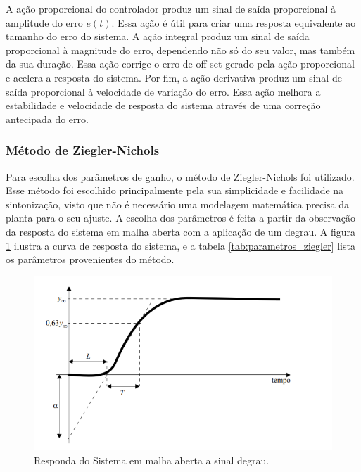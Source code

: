 A ação proporcional do controlador produz um sinal de saída proporcional à amplitude do erro $e(t)$. Essa ação é útil para criar uma resposta equivalente ao tamanho do erro do sistema. A ação integral produz um sinal de saída proporcional à magnitude do erro, dependendo não só do seu valor, mas também da sua duração. Essa ação corrige o erro de off-set gerado pela ação proporcional e acelera a resposta do sistema. Por fim, a ação derivativa produz um sinal de saída proporcional à velocidade de variação do erro. Essa ação melhora a estabilidade e velocidade de resposta do sistema através de uma correção antecipada do erro. 


\subsubsection{Método de Ziegler-Nichols}


Para escolha dos parâmetros de ganho, o método de Ziegler-Nichols foi utilizado. Esse método foi escolhido principalmente pela sua simplicidade e facilidade na sintonização, visto que não é necessário uma modelagem matemática precisa da planta para o seu ajuste. 
A escolha dos parâmetros é feita a partir da observação da resposta do sistema em malha aberta com a aplicação de um degrau. A figura \ref{fig:resposta_sistema} ilustra a curva de resposta do sistema, e a tabela \ref{tab:parametros_ziegler} lista os parâmetros provenientes do método.


\begin{figure}[h]
    \centering
    \includegraphics[scale=0.45]{figuras/implementacao/hardware/resposta.png}
    \caption{Responda do Sistema em malha aberta a sinal degrau.}
    \label{fig:resposta_sistema}
\end{figure}

